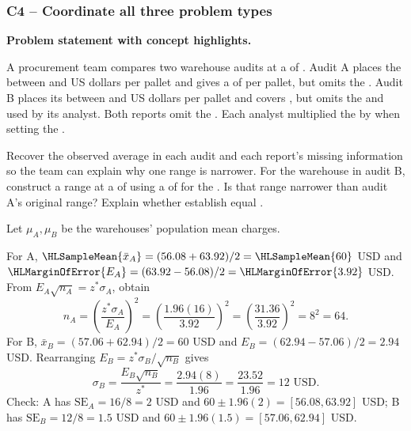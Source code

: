 \clearpage
\subsubsection*{C4 -- Coordinate all three problem types}\label{sol:c4-advanced-1}
\textbf{Problem statement with concept highlights.}
\begingroup\raggedright
A procurement team compares two warehouse audits at a  of . Audit A places the   between  and  US dollars per pallet and gives a   of  per pallet, but omits the  . Audit B places its  between  and  US dollars per pallet and covers , but omits the    and used by its analyst. Both reports omit the  . Each analyst multiplied the   by  when setting the   .

Recover the observed average in each audit and each report's missing information so the team can explain why one range is narrower. For the warehouse in audit B, construct a range at a  of  using a  of  for the   . Is that range narrower than audit A's original range? Explain whether   establish equal .
\par\endgroup

Let $\mu_A,\mu_B$ be the warehouses' population mean charges. 

For A, $\HLSampleMean{\bar x_A}=(56.08+63.92)/2=\HLSampleMean{60}$ USD and $\HLMarginOfError{E_A}=(63.92-56.08)/2=\HLMarginOfError{3.92}$ USD.
From $E_A\sqrt{n_A}=z^*\sigma_A$, obtain
\[
n_A=\left(\frac{z^*\sigma_A}{E_A}\right)^2
=\left(\frac{1.96(16)}{3.92}\right)^2
=\left(\frac{31.36}{3.92}\right)^2=8^2=64.
\]
For B, $\bar x_B=(57.06+62.94)/2=60$ USD and $E_B=(62.94-57.06)/2=2.94$ USD. Rearranging $E_B=z^*\sigma_B/\sqrt{n_B}$ gives
\[
\sigma_B=\frac{E_B\sqrt{n_B}}{z^*}
=\frac{2.94(8)}{1.96}=\frac{23.52}{1.96}=12\text{ USD}.
\]
Check: A has $\mathrm{SE}_A=16/8=2$ USD and $60\pm1.96(2)=[56.08,63.92]$ USD; B has $\mathrm{SE}_B=12/8=1.5$ USD and $60\pm1.96(1.5)=[57.06,62.94]$ USD.

